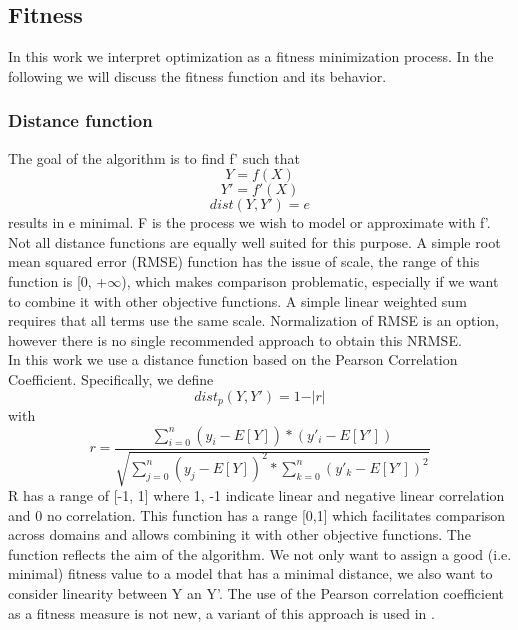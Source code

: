 \subsection{Fitness}
In this work we interpret optimization as a fitness minimization process. In the following we will discuss the fitness function and its behavior.
\subsubsection{Distance function}
The goal of the algorithm is to find f' such that
\[Y = f(X)\]
\[Y' = f'(X)\]
\[dist(Y, Y') = e\]
results in e minimal. F is the process we wish to model or approximate with f'.\\
Not all distance functions are equally well suited for this purpose. A simple root mean squared error (RMSE) function has the issue of scale, the range of this function is [0, +$\infty$), which makes comparison problematic, especially if we want to combine it with other objective functions. A simple linear weighted sum requires that all terms use the same scale. 
Normalization of RMSE is an option, however there is no single recommended approach to obtain this NRMSE. \\
In this work we use a distance function based on the Pearson Correlation Coefficient. Specifically, we define 
\[
dist_p(Y, Y') = 1 - \vert r \vert
\]
with
\[
r = \frac{\sum_{i=0}^{n}{(y_i-E[Y])*(y'_i-E[Y'])}}{\sqrt{\sum_{j=0}^{n}{(y_j-E[Y])^2}*\sum_{k=0}^{n}{(y'_k-E[Y'])^2}}}
\]
R has a range of [-1, 1] where 1, -1 indicate linear and negative linear correlation and 0 no correlation.
This function has a range [0,1] which facilitates comparison across domains and allows combining it with other objective functions.
The function reflects the aim of the algorithm. We not only want to assign a good (i.e. minimal) fitness value to a model that has a minimal distance, we also want to consider linearity between Y an Y'. The use of the Pearson correlation coefficient as a fitness measure is not new, a variant of this approach is used in \citep{pearson}.

